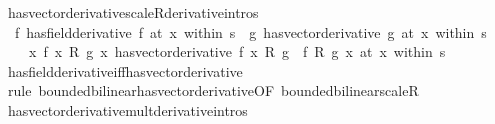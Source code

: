 \begin{isabellebody}
\endisatagproof
{\isafoldproof}%
%
\isadelimproof
\isanewline
%
\endisadelimproof
\isanewline
{}\isamarkupfalse%
\ has{\isacharunderscore}{\kern0pt}vector{\isacharunderscore}{\kern0pt}derivative{\isacharunderscore}{\kern0pt}scaleR{\isacharbrackleft}{\kern0pt}derivative{\isacharunderscore}{\kern0pt}intros{\isacharbrackright}{\kern0pt}{\isacharcolon}{\kern0pt}\isanewline
\ \ {\isachardoublequoteopen}{\isacharparenleft}{\kern0pt}f\ has{\isacharunderscore}{\kern0pt}field{\isacharunderscore}{\kern0pt}derivative\ f{\isacharprime}{\kern0pt}{\isacharparenright}{\kern0pt}\ {\isacharparenleft}{\kern0pt}at\ x\ within\ s{\isacharparenright}{\kern0pt}\ {\isasymLongrightarrow}\ {\isacharparenleft}{\kern0pt}g\ has{\isacharunderscore}{\kern0pt}vector{\isacharunderscore}{\kern0pt}derivative\ g{\isacharprime}{\kern0pt}{\isacharparenright}{\kern0pt}\ {\isacharparenleft}{\kern0pt}at\ x\ within\ s{\isacharparenright}{\kern0pt}\ {\isasymLongrightarrow}\isanewline
\ \ \ \ {\isacharparenleft}{\kern0pt}{\isacharparenleft}{\kern0pt}{\isasymlambda}x{\isachardot}{\kern0pt}\ f\ x\ {\isacharasterisk}{\kern0pt}\isactrlsub R\ g\ x{\isacharparenright}{\kern0pt}\ has{\isacharunderscore}{\kern0pt}vector{\isacharunderscore}{\kern0pt}derivative\ {\isacharparenleft}{\kern0pt}f\ x\ {\isacharasterisk}{\kern0pt}\isactrlsub R\ g{\isacharprime}{\kern0pt}\ {\isacharplus}{\kern0pt}\ f{\isacharprime}{\kern0pt}\ {\isacharasterisk}{\kern0pt}\isactrlsub R\ g\ x{\isacharparenright}{\kern0pt}{\isacharparenright}{\kern0pt}\ {\isacharparenleft}{\kern0pt}at\ x\ within\ s{\isacharparenright}{\kern0pt}{\isachardoublequoteclose}\isanewline
%
\isadelimproof
\ \ %
\endisadelimproof
%
\isatagproof
{}\isamarkupfalse%
\ has{\isacharunderscore}{\kern0pt}field{\isacharunderscore}{\kern0pt}derivative{\isacharunderscore}{\kern0pt}iff{\isacharunderscore}{\kern0pt}has{\isacharunderscore}{\kern0pt}vector{\isacharunderscore}{\kern0pt}derivative\isanewline
\ \ \isamarkupfalse%
\ {\isacharparenleft}{\kern0pt}rule\ bounded{\isacharunderscore}{\kern0pt}bilinear{\isachardot}{\kern0pt}has{\isacharunderscore}{\kern0pt}vector{\isacharunderscore}{\kern0pt}derivative{\isacharbrackleft}{\kern0pt}OF\ bounded{\isacharunderscore}{\kern0pt}bilinear{\isacharunderscore}{\kern0pt}scaleR{\isacharbrackright}{\kern0pt}{\isacharparenright}{\kern0pt}%
\endisatagproof
{\isafoldproof}%
%
\isadelimproof
\isanewline
%
\endisadelimproof
\isanewline
{}\isamarkupfalse%
\ has{\isacharunderscore}{\kern0pt}vector{\isacharunderscore}{\kern0pt}derivative{\isacharunderscore}{\kern0pt}mult{\isacharbrackleft}{\kern0pt}derivative{\isacharunderscore}{\kern0pt}intros{\isacharbrackright}{\kern0pt}{\isacharcolon}{\kern0pt}\isanewline

\end{isabellebody}
